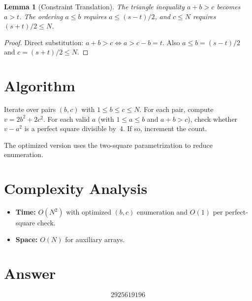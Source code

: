\documentclass[11pt]{article}
\newtheorem{lemma}[theorem]{Lemma}
\begin{document}
\begin{lemma}[Constraint Translation]
The triangle inequality $a + b > c$ becomes $a > t$. The ordering $a \leq b$ requires $a \leq (s - t)/2$, and $c \leq N$ requires $(s + t)/2 \leq N$.
\end{lemma}

\begin{proof}
Direct substitution: $a + b > c \Leftrightarrow a > c - b = t$. Also $a \leq b = (s-t)/2$ and $c = (s+t)/2 \leq N$.
\end{proof}

\section{Algorithm}

Iterate over pairs $(b, c)$ with $1 \leq b \leq c \leq N$. For each pair, compute $v = 2b^2 + 2c^2$. For each valid $a$ (with $1 \leq a \leq b$ and $a + b > c$), check whether $v - a^2$ is a perfect square divisible by~4. If so, increment the count.

The optimized version uses the two-square parametrization to reduce enumeration.

\section{Complexity Analysis}

\begin{itemize}
    \item \textbf{Time:} $O(N^2)$ with optimized $(b,c)$ enumeration and $O(1)$ per perfect-square check.
    \item \textbf{Space:} $O(N)$ for auxiliary arrays.
\end{itemize}

\section{Answer}

\[
\boxed{2925619196}
\]
\end{document}
